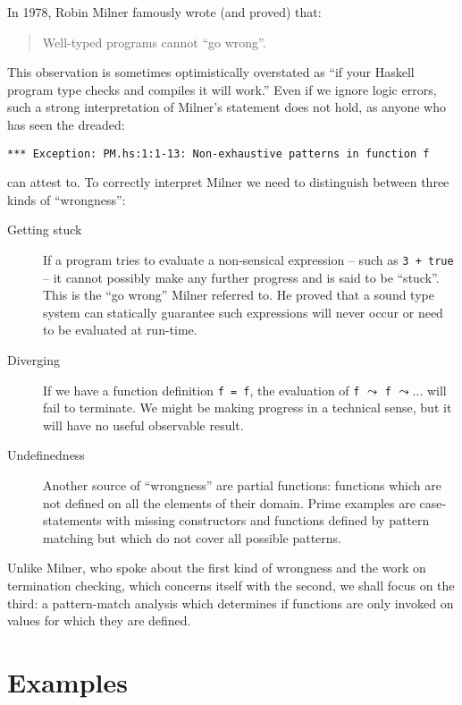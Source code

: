 \documentclass[a4paper]{report}
\begin{document}
In 1978, Robin Milner \cite{Milner78atheory} famously wrote (and proved) that:
\begin{quotation}
Well-typed programs cannot ``go wrong''. 
\end{quotation}
This observation is sometimes
optimistically overstated as ``if your Haskell program type checks and compiles it will work.'' Even if we ignore logic errors, such a strong interpretation of Milner's statement does not hold, as anyone who has seen the dreaded:
\begin{verbatim}
*** Exception: PM.hs:1:1-13: Non-exhaustive patterns in function f
\end{verbatim}
can attest to. To correctly interpret Milner we need to distinguish between three kinds of ``wrongness'':
\begin{description}
\item[Getting stuck] If a program tries to evaluate a non-sensical expression -- such as {\tt 3 + true} -- it cannot possibly make any further progress and is said to be ``stuck''. This is the ``go wrong'' Milner referred to. He proved that a sound type system can statically guarantee such expressions will never occur or need to be evaluated at run-time.
\item[Diverging] If we have a function definition {\tt f = f}, the evaluation of {\tt f} $\leadsto$ {\tt f} $\leadsto ...$ will fail to terminate. We might be making progress in a technical sense, but it will have no useful observable result.
\item[Undefinedness] Another source of ``wrongness'' are partial functions: functions which are not defined on all the elements of their domain. Prime examples are case-statements with missing constructors and functions defined by pattern matching but which do not cover all possible patterns. 
\end{description}

Unlike Milner, who spoke about the first kind of wrongness and the work on termination checking, which concerns itself with the second, we shall focus on the third: a pattern-match analysis which determines if functions are only invoked on values for which they are defined.


\section{Examples}\label{secexamples} %
\end{document}

